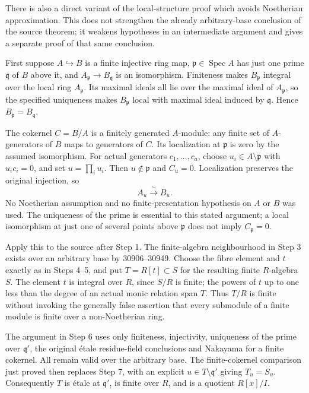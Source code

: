 There is also a direct variant of the local-structure proof which avoids Noetherian approximation. This does not strengthen the already arbitrary-base conclusion of the source theorem; it weakens hypotheses in an intermediate argument and gives a separate proof of that same conclusion.

First suppose \(A\hookrightarrow B\) is a finite injective ring map, \(\mathfrak p\in\operatorname{Spec}A\) has just one prime \(\mathfrak q\) of \(B\) above it, and \(A_{\mathfrak p}\to B_{\mathfrak q}\) is an isomorphism. Finiteness makes \(B_{\mathfrak p}\) integral over the local ring \(A_{\mathfrak p}\). Its maximal ideals all lie over the maximal ideal of \(A_{\mathfrak p}\), so the specified uniqueness makes \(B_{\mathfrak p}\) local with maximal ideal induced by \(\mathfrak q\). Hence \(B_{\mathfrak p}=B_{\mathfrak q}\).

The cokernel \(C=B/A\) is a finitely generated \(A\)-module: any finite set of \(A\)-generators of \(B\) maps to generators of \(C\). Its localization at \(\mathfrak p\) is zero by the assumed isomorphism. For actual generators \(c_1,\ldots,c_a\), choose \(u_i\in A\setminus\mathfrak p\) with \(u_ic_i=0\), and set \(u=\prod_i u_i\). Then \(u\notin\mathfrak p\) and \(C_u=0\). Localization preserves the original injection, so \[
A_u\xrightarrow{\;\sim\;}B_u.
\] No Noetherian assumption and no finite-presentation hypothesis on \(A\) or \(B\) was used. The uniqueness of the prime is essential to this stated argument; a local isomorphism at just one of several points above \(\mathfrak p\) does not imply \(C_{\mathfrak p}=0\).

Apply this to the source after Step 1. The finite-algebra neighbourhood in Step 3 exists over an arbitrary base by 30906--30949. Choose the fibre element and \(t\) exactly as in Steps 4--5, and put \(T=R[t]\subset S\) for the resulting finite \(R\)-algebra \(S\). The element \(t\) is integral over \(R\), since \(S/R\) is finite; the powers of \(t\) up to one less than the degree of an actual monic relation span \(T\). Thus \(T/R\) is finite without invoking the generally false assertion that every submodule of a finite module is finite over a non-Noetherian ring.

The argument in Step 6 uses only finiteness, injectivity, uniqueness of the prime over \(\mathfrak q'\), the original étale residue-field conclusions and Nakayama for a finite cokernel. All remain valid over the arbitrary base. The finite-cokernel comparison just proved then replaces Step 7, with an explicit \(u\in T\setminus\mathfrak q'\) giving \(T_u=S_u\). Consequently \(T\) is étale at \(\mathfrak q'\), is finite over \(R\), and is a quotient \(R[x]/I\).


